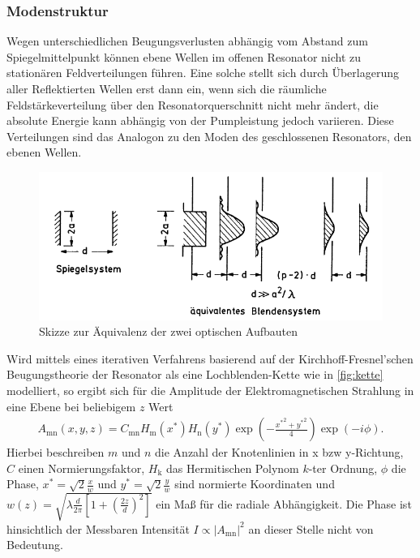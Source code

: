 \subsubsection{Modenstruktur}
Wegen unterschiedlichen Beugungsverlusten abhängig vom Abstand zum Spiegelmittelpunkt können ebene Wellen im offenen Resonator nicht zu stationären Feldverteilungen führen. Eine solche stellt sich durch Überlagerung aller Reflektierten Wellen erst dann ein, wenn sich die räumliche Feldstärkeverteilung über den Resonatorquerschnitt nicht mehr ändert, die absolute Energie kann abhängig von der Pumpleistung jedoch variieren. Diese Verteilungen sind das Analogon zu den Moden des geschlossenen Resonators, den ebenen Wellen.
\begin{figure}[H]
    \centering
    \includegraphics[scale=0.7]{Ressourcen/kette.png}
    \caption{Skizze zur Äquivalenz der zwei optischen Aufbauten\cite{Demtroeder}}\label{fig:kette}
\end{figure}
Wird mittels eines iterativen Verfahrens basierend auf der Kirchhoff-Fresnel'schen Beugungstheorie der Resonator als eine Lochblenden-Kette  wie in \autoref{fig:kette} modelliert, so ergibt sich für die Amplitude der Elektromagnetischen Strahlung in eine Ebene bei beliebigem $z$ Wert
\begin{align}
    A_\text{mn}(x,y,z)=C_\text{mn}H_\text{m}(x^*)H_\text{n}(y^*)\exp{\left(-\frac{{x^*}^2+{y^*}^2}{4}\right)}\exp{(-i\phi)}\text{.}\label{eqn:A}
\end{align}
Hierbei beschreiben $m$ und $n$ die Anzahl der Knotenlinien in x bzw y-Richtung, $C$ einen Normierungsfaktor, $H_\text{k}$ das Hermitischen Polynom $k$-ter Ordnung, $\phi$ die Phase, $x^*=\sqrt{2}\frac{x}{w}$ und $y^*=\sqrt{2}\frac{y}{w}$ sind normierte Koordinaten und $w(z)=\sqrt{\lambda\frac{d}{2\pi}{\left[1+\left(\frac{2z}{d}\right)^2\right]}}$ ein Maß für die radiale Abhängigkeit. Die Phase ist hinsichtlich der Messbaren Intensität $I\propto|A_\text{mn}|^2$ an dieser Stelle nicht von Bedeutung.
